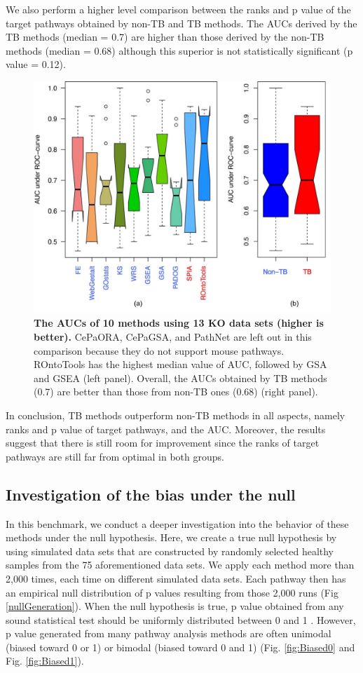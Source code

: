 We also perform a higher level comparison between the ranks and p value of the target pathways obtained by non-TB and TB methods. The AUCs derived by the TB methods (median = 0.7) are higher than those derived by the non-TB methods (median = 0.68) although this superior is not statistically significant (p value = 0.12). 


\begin{figure}
\centering
	\includegraphics[width=0.8\linewidth]{../Figures/AUC_combined_v3}
  \caption{\textbf{The AUCs of 10 methods using 13 KO data sets (higher is better).} CePaORA, CePaGSA, and PathNet are left out in this comparison because they do not support mouse pathways. ROntoTools has the highest median value of AUC, followed by GSA and GSEA (left panel). Overall, the AUCs obtained by TB methods (0.7) are better than those from non-TB ones (0.68) (right panel). }
  \label{fig:AUC}
\end{figure}




In conclusion, TB methods outperform non-TB methods in all aspects, namely ranks and p value of target pathways, and the AUC. 
Moreover, the results suggest that there is still room for improvement since the ranks of target pathways are still far from optimal in both groups.

\subsection{Investigation of the bias under the null}

In this benchmark, we conduct a deeper investigation into the behavior of these methods under the null hypothesis. 
Here, we create a true null hypothesis by using simulated data sets that are constructed by randomly selected healthy samples from the 75 aforementioned data sets.
We apply each method  more than 2,000 times, each time on different simulated data sets.
Each pathway then has an empirical null distribution of p values resulting from those 2,000 runs (Fig \ref{nullGeneration}).
When the null hypothesis is true, p value obtained from any sound statistical test should be uniformly distributed  between 0 and 1 \cite{barton2013correction, fodor2007towards}.
However, p value generated from many pathway analysis methods are often unimodal (biased toward 0 or 1) or bimodal (biased toward 0 and 1) (Fig. \ref{fig:Biased0} and Fig. \ref{fig:Biased1}). 


